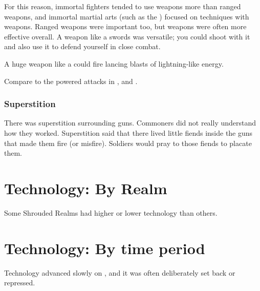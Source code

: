 For this reason, immortal fighters tended to use \melee weapons more than ranged weapons, and immortal martial arts (such as the ) focused on techniques with \melee weapons.
Ranged weapons were important too, but \melee weapons were often more effective overall.
A \melee weapon like a swords was versatile; you could shoot with it and also use it to defend yourself in close combat. 

A huge weapon like a \senaan could fire lancing blasts of lightning-like energy. 

Compare to the powered attacks in \cite{VideoGame:FinalFantasyVII}, \cite{Anime:FinalFantasyVII:LastOrder} and \cite{Anime:FinalFantasyVII:AdventChildren}. 





\subsubsection{Superstition}
There was superstition surrounding guns. 
Commoners did not really understand how they worked. 
Superstition said that there lived little fiends inside the guns that made them fire (or misfire).
Soldiers would pray to those fiends to placate them. 















\section{Technology: By Realm}
Some Shrouded Realms had higher or lower technology than others.














\section{Technology: By time period}
Technology advanced slowly on \Miith{}, and it was often deliberately set back or repressed. 







